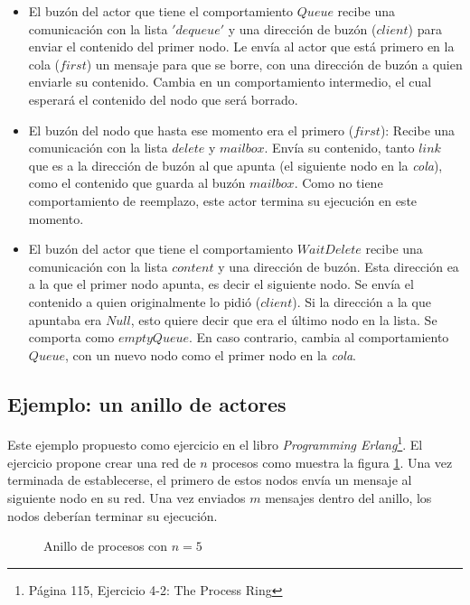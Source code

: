 \begin{itemize}
 \item El buzón del actor que tiene el comportamiento $Queue$ recibe una comunicación con la lista $'dequeue'$ y una dirección de buzón ($client$) para enviar el contenido del primer nodo.
 \subitem Le envía al actor que está primero en la cola ($first$) un mensaje para que se borre, con una dirección de buzón a quien enviarle su contenido.
 \subitem Cambia en un comportamiento intermedio, el cual esperará el contenido del nodo que será borrado.
 \item El buzón del nodo que hasta ese momento era el primero ($first$):
 \subitem Recibe una comunicación con la lista $delete$ y $mailbox$.
 \subitem Envía su contenido, tanto $link$ que es a la dirección de buzón al que apunta (el siguiente nodo en la \textit{cola}), como el contenido que guarda al buzón $mailbox$. Como no tiene comportamiento de reemplazo, este actor termina su ejecución en este momento.
 \item El buzón del actor que tiene el comportamiento $WaitDelete$ recibe una comunicación con la lista $content$ y una dirección de buzón. Esta dirección ea a la que el primer nodo apunta, es decir el siguiente nodo.
 \subitem Se envía el contenido a quien originalmente lo pidió ($client$).
 \subitem Si la dirección a la que apuntaba era $Null$, esto quiere decir que era el último nodo en la lista. Se comporta como $emptyQueue$.
 \subitem En caso contrario, cambia al comportamiento $Queue$, con un nuevo nodo como el primer nodo en la \textit{cola}.
\end{itemize}


\subsection{Ejemplo: un anillo de actores}
Este ejemplo propuesto como ejercicio en el libro \textit{Programming Erlang}\cite{Cesarini:2009:EP:1717841}\footnote{Página 115, Ejercicio 4-2: The Process Ring}. El ejercicio propone crear una red de $n$ procesos como muestra la figura \ref{fig:anillo}. Una vez terminada de establecerse, el primero de estos nodos envía un mensaje al siguiente nodo en su red.  Una vez enviados $m$ mensajes dentro del anillo, los nodos deberían terminar su ejecución.

\begin{figure}[H]
\centering
{}
\caption{Anillo de procesos con $n=5$}
\label{fig:anillo}
\end{figure}

